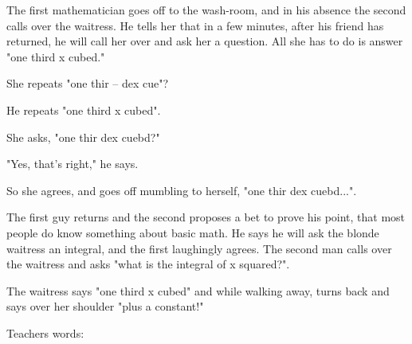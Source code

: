 The first mathematician goes off to the wash-room, and in his absence the second calls over the waitress. He tells her that in a few minutes, after his friend has returned, he will call her over and ask her a question. All she has to do is answer "one third x cubed." 

She repeats "one thir -- dex cue"?

He repeats "one third x cubed".

She asks, "one thir dex cuebd?"

"Yes, that's right," he says.

So she agrees, and goes off mumbling to herself, "one thir dex cuebd...". 

The first guy returns and the second proposes a bet to prove his point, that most people do know something about basic math. He says he will ask the blonde waitress an integral, and the first laughingly agrees. The second man calls over the waitress and asks "what is the integral of x squared?".

The waitress says "one third x cubed" and while walking away, turns back and says over her shoulder "plus a constant!"
	\begin{center}\underline{\hspace{5 cm}}\end{center}

Teachers words:

